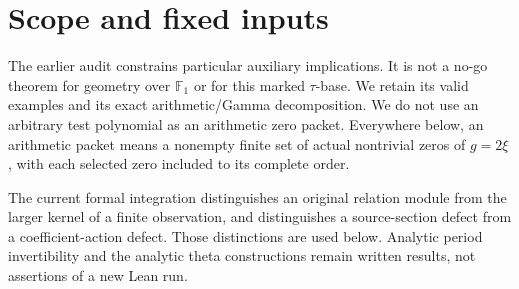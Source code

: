 \documentclass[11pt,a4paper]{article}
\begin{document}


\begin{abstract}
We continue the original marked Split-Zero construction, retaining its absolute pointed base, supported zero, amplitude and support observations, full theta complex, and prequotient norms. We construct the external product of the original packet's polynomial-exponential complex. Its top cohomology has rank $d^k$, its special fibre is the full tensor packet, and its diagonal parameter operator specializes to the original sum action. Its finite-field realization has weight $k$ under Deligne's actual hypotheses. An explicit coefficient and source diagram connects this family to the original theta complex; no Frobenius intertwiner is assumed. We then calculate the signed arithmetic/Gamma correction simultaneously at all four original endpoints. The result is a single integral of the actual multiplier against a signed difference of two equal-rank source/relation projection densities. Its differentiated sections are original relations, their complete quadratic contribution is calculated, and a finite quadrature error bound is proved. A closed formula for the first conjugate-pair calculation retains the exact cancellation $|h|^2w_h=|2\xi|^2/(2\pi)$. These results do not prove the remaining uniform upper bound.
\end{abstract}


\section{Scope and fixed inputs}
The earlier audit constrains particular auxiliary implications. It is not a no-go theorem for geometry over $\mathbb F_1$ or for this marked $\tau$-base. We retain its valid examples and its exact arithmetic/Gamma decomposition. We do not use an arbitrary test polynomial as an arithmetic zero packet. Everywhere below, an arithmetic packet means a nonempty finite set of actual nontrivial zeros of $g=2\xi$, with each selected zero included to its complete order.

The current formal integration distinguishes an original relation module from the larger kernel of a finite observation, and distinguishes a source-section defect from a coefficient-action defect. Those distinctions are used below. Analytic period invertibility and the analytic theta constructions remain written results, not assertions of a new Lean run.
\end{document}
